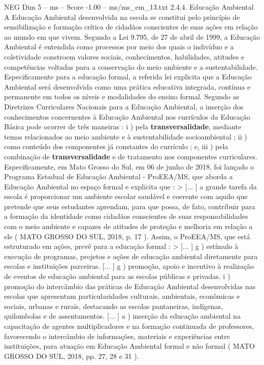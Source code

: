 \begin{textsample}{NEG Dim 5 – ms – Score -1.00 – ms/ms\_em\_13.txt}  \label{ex:f5_neg_075}
2.4.4.
Educação Ambiental A Educação Ambiental desenvolvida na escola se constitui pelo princípio de sensibilização e formação crítica de cidadãos conscientes de suas ações em relação ao mundo em que vivem.
Segundo a Lei 9.795, de 27 de abril de 1999, a Educação Ambiental é entendida como processos por meio dos quais o indivíduo e a coletividade constroem valores sociais, conhecimentos, habilidades, atitudes e competências voltadas para a conservação do meio ambiente e a sustentabilidade.
Especificamente para a educação formal, a referida lei explicita que a Educação Ambiental será desenvolvida como uma prática educativa integrada, contínua e permanente em todos os níveis e modalidades do ensino formal.
Segundo as Diretrizes Curriculares Nacionais para a Educação Ambiental, a inserção dos conhecimentos concernentes à Educação Ambiental nos currículos da Educação Básica pode ocorrer de três maneiras : i ) pela \textbf{transversalidade}, mediante temas relacionados ao meio ambiente e à sustentabilidade socioambiental ; ii ) como conteúdo dos componentes já constantes do currículo ; e, iii ) pela combinação de \textbf{transversalidade} e de tratamento nos componentes curriculares.
Especificamente, em Mato Grosso do Sul, em 06 de junho de 2018, foi lançado o Programa Estadual de Educação Ambiental - ProEEA/MS, que aborda a Educação Ambiental no espaço formal e explicita que : > [... ] a grande tarefa da escola é proporcionar um ambiente escolar saudável e coerente com aquilo que pretende que seus estudantes aprendam, para que possa, de fato, contribuir para a formação da identidade como cidadãos conscientes de suas responsabilidades com o meio ambiente e capazes de atitudes de proteção e melhoria em relação a ele ( MATO GROSSO DO SUL, 2018, p. 17 ).
Assim, o ProEEA/MS, que está estruturado em ações, prevê para a educação formal : > [... ] g ) estímulo à execução de programas, projetos e ações de educação ambiental diretamente para escolas e instituições parceiras. [... ] g ) promoção, apoio e incentivo à realização de eventos de educação ambiental para as escolas públicas e privadas. i ) promoção do intercâmbio das práticas de Educação Ambiental desenvolvidas nas escolas que apresentam particularidades culturais, ambientais, econômicas e sociais, urbanas e rurais, destacando as escolas pantaneiras, indígenas, quilombolas e de assentamentos. [... ] a ) inserção da educação ambiental na capacitação de agentes multiplicadores e na formação continuada de professores, favorecendo o intercâmbio de informações, materiais e experiências entre instituições, para atuação em Educação Ambiental formal e não formal ( MATO GROSSO DO SUL, 2018, pp. 27, 28 e 31 ).

\end{textsample}
